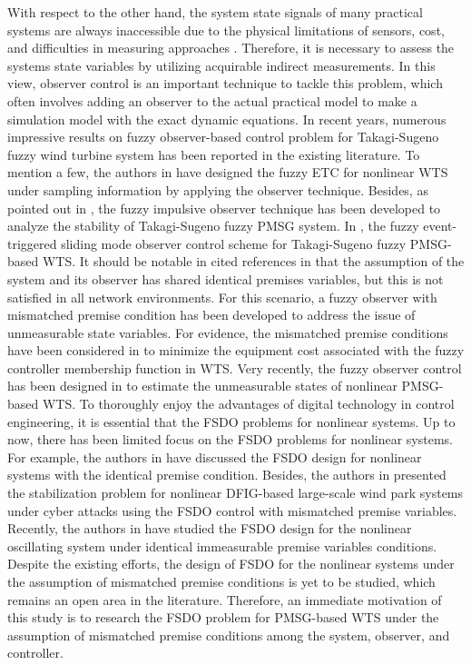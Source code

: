 \documentclass[preprint,11pt]{elsarticle}
\begin{document}
With respect to the other hand, the system state signals of many practical systems are always inaccessible due to the physical limitations of sensors, cost, and difficulties in measuring approaches \cite{pengc,observer1}. Therefore, it is necessary to assess the systems state variables by utilizing acquirable indirect measurements. In this view, observer control is an important technique to tackle this problem, which often involves adding an observer to the actual practical model to make a simulation model with the exact dynamic equations. In recent years, numerous impressive results on fuzzy observer-based control problem for {Takagi-Sugeno} fuzzy wind turbine system has been reported in the existing literature. {To mention a few, the authors in \cite{sara1} have designed the fuzzy ETC for nonlinear WTS under sampling information by applying the observer technique. Besides, as pointed out in \cite{vino1}, the fuzzy impulsive observer technique has been developed to analyze the stability of {Takagi-Sugeno} fuzzy PMSG system. {In \cite{prakash1}, the fuzzy event-triggered sliding mode observer control scheme for {Takagi-Sugeno} fuzzy PMSG-based WTS.} It should be notable in cited references in \cite{sara1,vino1,prakash1} that the assumption of the system and its observer has shared identical premises variables, but this is not satisfied in all network environments. For this scenario, a fuzzy observer with mismatched premise condition has been developed to address the issue of unmeasurable state variables. For evidence, the mismatched premise conditions have been considered in \cite{Hwang1} to minimize the equipment cost associated with the fuzzy controller membership function in WTS. Very recently, the fuzzy observer control has been designed in \cite{sub1} to estimate the unmeasurable states of nonlinear PMSG-based WTS. To thoroughly enjoy the advantages of digital technology in control engineering, it is essential that the FSDO problems for nonlinear systems. Up to now, there has been limited focus on the FSDO problems for nonlinear systems. For example, the authors in \cite{obs0} have discussed the FSDO design for nonlinear systems with the identical premise condition. Besides, the authors in \cite{OOO-1} presented the stabilization problem for nonlinear DFIG-based large-scale wind park systems under cyber attacks using the FSDO control with mismatched premise variables. Recently, the authors in \cite{obs1} have studied the FSDO design for the nonlinear oscillating system under identical immeasurable premise variables conditions. Despite the existing efforts, the design of FSDO for the nonlinear systems under the assumption of mismatched premise conditions is yet to be studied, which remains an open area in the literature. Therefore, an immediate motivation of this study is to research the FSDO problem for PMSG-based WTS under the assumption of mismatched premise conditions among the system, observer, and controller.}
\end{document}
